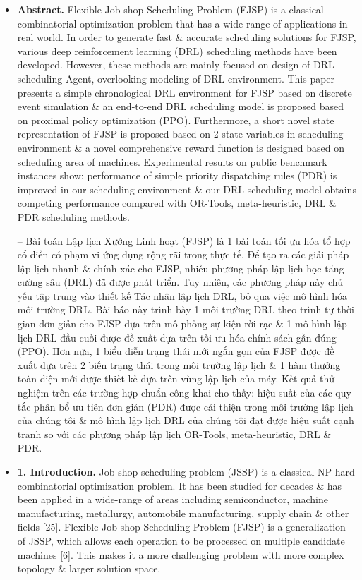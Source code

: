 \documentclass{article}
\begin{document}
\begin{itemize}
    \item {\bf Abstract.} Flexible Job-shop Scheduling Problem (FJSP) is a classical combinatorial optimization problem that has a wide-range of applications in real world. In order to generate fast \& accurate scheduling solutions for FJSP, various deep reinforcement learning (DRL) scheduling methods have been developed. However, these methods are mainly focused on design of DRL scheduling Agent, overlooking modeling of DRL environment. This paper presents a simple chronological DRL environment for FJSP based on discrete event simulation \& an end-to-end DRL scheduling model is proposed based on proximal policy optimization (PPO). Furthermore, a short novel state representation of FJSP is proposed based on 2 state variables in scheduling environment \& a novel comprehensive reward function is designed based on scheduling area of machines. Experimental results on public benchmark instances show: performance of simple priority dispatching rules (PDR) is improved in our scheduling environment \& our DRL scheduling model obtains competing performance compared with OR-Tools, meta-heuristic, DRL \& PDR scheduling methods.

    -- Bài toán Lập lịch Xưởng Linh hoạt (FJSP) là 1 bài toán tối ưu hóa tổ hợp cổ điển có phạm vi ứng dụng rộng rãi trong thực tế. Để tạo ra các giải pháp lập lịch nhanh \& chính xác cho FJSP, nhiều phương pháp lập lịch học tăng cường sâu (DRL) đã được phát triển. Tuy nhiên, các phương pháp này chủ yếu tập trung vào thiết kế Tác nhân lập lịch DRL, bỏ qua việc mô hình hóa môi trường DRL. Bài báo này trình bày 1 môi trường DRL theo trình tự thời gian đơn giản cho FJSP dựa trên mô phỏng sự kiện rời rạc \& 1 mô hình lập lịch DRL đầu cuối được đề xuất dựa trên tối ưu hóa chính sách gần đúng (PPO). Hơn nữa, 1 biểu diễn trạng thái mới ngắn gọn của FJSP được đề xuất dựa trên 2 biến trạng thái trong môi trường lập lịch \& 1 hàm thưởng toàn diện mới được thiết kế dựa trên vùng lập lịch của máy. Kết quả thử nghiệm trên các trường hợp chuẩn công khai cho thấy: hiệu suất của các quy tắc phân bổ ưu tiên đơn giản (PDR) được cải thiện trong môi trường lập lịch của chúng tôi \& mô hình lập lịch DRL của chúng tôi đạt được hiệu suất cạnh tranh so với các phương pháp lập lịch OR-Tools, meta-heuristic, DRL \& PDR.
    \item {\bf1. Introduction.} Job shop scheduling problem (JSSP) is a classical NP-hard combinatorial optimization problem. It has been studied for decades \& has been applied in a wide-range of areas including semiconductor, machine manufacturing, metallurgy, automobile manufacturing, supply chain \& other fields [25]. Flexible Job-shop Scheduling Problem (FJSP) is a generalization of JSSP, which allows each operation to be processed on multiple candidate machines [6]. This makes it a more challenging problem with more complex topology \& larger solution space.


\end{itemize}
\end{document}
